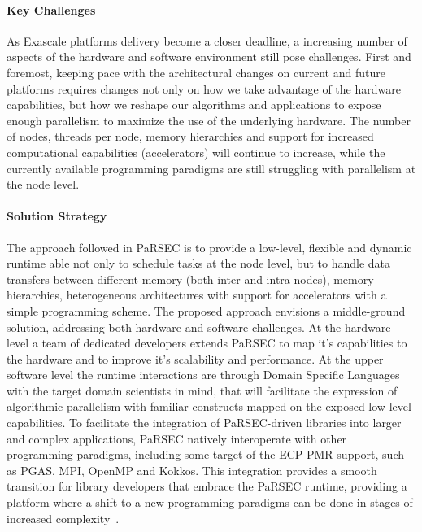 \paragraph{Key Challenges}

As Exascale platforms delivery become a closer deadline, a increasing number of
aspects of the hardware and software environment still pose challenges. First
and foremost, keeping pace with the architectural changes on current and future
platforms requires changes not only on how we take advantage of the hardware
capabilities, but how we reshape our algorithms and applications to expose
enough parallelism to maximize the use of the underlying hardware. The number of
nodes, threads per node, memory hierarchies and support for increased
computational capabilities (accelerators) will continue to increase, while the
currently available programming paradigms are still struggling with parallelism
at the node level.

\paragraph{Solution Strategy}
The approach followed in PaRSEC is to provide a low-level, flexible and dynamic
runtime able not only to schedule tasks at the node level, but to handle data
transfers between different memory (both inter and intra nodes), memory
hierarchies, heterogeneous architectures with support for accelerators with a
simple programming scheme. The proposed approach envisions a middle-ground
solution, addressing both hardware and software challenges. At the hardware
level a team of dedicated developers extends PaRSEC to map it's capabilities to
the hardware and to improve it's scalability and performance. At the upper
software level the runtime interactions are through Domain Specific Languages
with the target domain scientists in mind, that will facilitate the expression
of algorithmic parallelism with familiar constructs mapped on the exposed
low-level capabilities. To facilitate the integration of PaRSEC-driven libraries
into larger and complex applications, PaRSEC natively interoperate with other
programming paradigms, including some target of the ECP PMR support, such as
PGAS, MPI, OpenMP and Kokkos. This integration provides a smooth transition for
library developers that embrace the PaRSEC runtime, providing a platform where a
shift to a new programming paradigms can be done in stages of increased
complexity~\cite{lorapo-protools,BLR_LU,parsec_pdgemm}.


